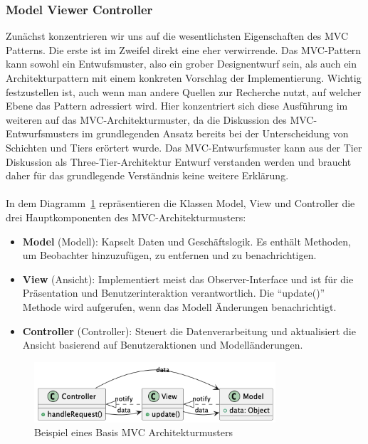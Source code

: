 \subsubsection{Model Viewer Controller}
Zunächst konzentrieren wir uns auf die wesentlichsten Eigenschaften des MVC Patterns. Die erste ist im Zweifel direkt eine eher verwirrende. Das MVC-Pattern kann sowohl ein Entwufsmuster, also ein grober Designentwurf sein, als auch ein Architekturpattern mit einem konkreten Vorschlag der Implementierung. Wichtig festzustellen ist, auch wenn man andere Quellen zur Recherche nutzt, auf welcher Ebene das Pattern adressiert wird.  Hier konzentriert sich diese Ausführung im weiteren auf das MVC-Architekturmuster, da die Diskussion des MVC-Entwurfsmusters im grundlegenden Ansatz bereits bei der Unterscheidung von Schichten und Tiers erörtert wurde. Das MVC-Entwurfsmuster kann aus der Tier Diskussion als Three-Tier-Architektur Entwurf verstanden werden und braucht daher für das grundlegende Verständnis keine weitere Erklärung.
\\\\
In dem Diagramm~\ref{fig:default-mvc} repräsentieren die Klassen Model, View und Controller die drei Hauptkomponenten des MVC-Architekturmusters:
\begin{itemize}
\item \textbf{Model} (Modell): Kapselt Daten und Geschäftslogik. Es enthält Methoden, um Beobachter hinzuzufügen, zu entfernen und zu benachrichtigen.
\item \textbf{View} (Ansicht): Implementiert meist das Observer-Interface und ist für die Präsentation und Benutzerinteraktion verantwortlich. Die \enquote{update()} Methode wird aufgerufen, wenn das Modell Änderungen benachrichtigt.
\item \textbf{Controller} (Controller): Steuert die Datenverarbeitung und aktualisiert die Ansicht basierend auf Benutzeraktionen und Modelländerungen.
\end{itemize}

\begin{figure}[ht]
  \centering
  \includegraphics[width=0.8\textwidth]{fig/uml/default-mvc.png}
  \caption{Beispiel eines Basis MVC Architekturmusters}
  \label{fig:default-mvc}
\end{figure}

